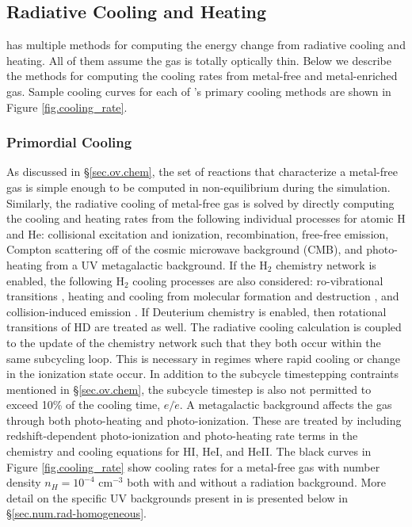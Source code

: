 \subsection{Radiative Cooling and Heating}
\label{sec.num.cooling}

\enzo has multiple methods for computing the energy change from
radiative cooling and heating.  All of them assume the gas is totally
optically thin.  Below we describe the methods for computing the
cooling rates from metal-free and metal-enriched gas.  Sample cooling
curves for each of \enzo's primary cooling methods are shown in Figure
\ref{fig.cooling_rate}.

\subsubsection{Primordial Cooling}

As discussed in \S\ref{sec.ov.chem}, the set of reactions that
characterize a metal-free gas is simple enough to be computed in
non-equilibrium during the simulation.  Similarly, the radiative
cooling of metal-free gas is solved by directly computing the cooling
and heating rates from the following individual processes for atomic
H and He: collisional excitation and ionization, recombination,
free-free emission, Compton scattering off of the cosmic microwave
background (CMB), and photo-heating from a UV metagalactic background.
If the H$_{2}$ chemistry network is enabled, the following H$_{2}$
cooling processes are also considered: ro-vibrational transitions 
\citep{1998A&A...335..403G}, heating and cooling from molecular
formation and destruction \citep{2009Sci...325..601T}, and 
collision-induced emission \citep{2004MNRAS.348.1019R}.  If Deuterium
chemistry is enabled, then rotational transitions of HD
\citep{1998A&A...335..403G} are treated as well.  The radiative
cooling calculation is coupled to the update of the chemistry network
such that they both occur within the same subcycling loop.  This is
necessary in regimes where rapid cooling or change in the ionization
state occur.  In
addition to the subcycle timestepping contraints mentioned in
\S\ref{sec.ov.chem}, the subcycle timestep is also not permitted to
exceed 10\% of the cooling time, $e/\dot{e}$.  A metagalactic
background affects the gas through both photo-heating and
photo-ionization.  These are treated by including redshift-dependent 
photo-ionization and photo-heating rate terms in the chemistry and
cooling equations for HI, HeI, and HeII.  The black curves in Figure
\ref{fig.cooling_rate} show cooling rates for a metal-free gas with
number density $n_{H} = 10^{-4}$ cm$^{-3}$ both with and without a
radiation background.  More detail on the specific UV backgrounds
present in \enzo is presented below in
\S\ref{sec.num.rad-homogeneous}.

